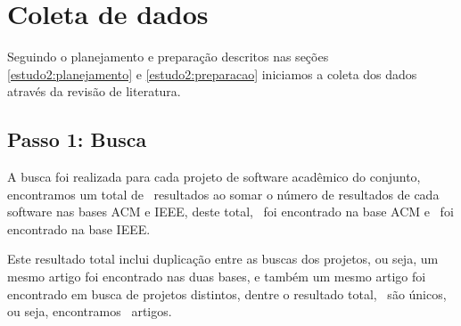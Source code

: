 

\section{Coleta de dados} \label{estudo2:coleta} %

Seguindo o planejamento e preparação descritos nas seções
\ref{estudo2:planejamento} e \ref{estudo2:preparacao} iniciamos a coleta dos
dados através da revisão de literatura.

\subsection{Passo 1: Busca}

A busca foi realizada para cada projeto de
software acadêmico do conjunto, encontramos um total de \SearchCount \
resultados ao somar o número de resultados de cada software nas bases ACM e
IEEE, deste total, \SearchACMCount \ foi encontrado na base ACM e
\SearchIEEECount \ foi encontrado na base IEEE.

Este resultado total inclui duplicação entre as buscas dos projetos, ou seja,
um mesmo artigo foi encontrado nas duas bases, e também um mesmo artigo foi
encontrado em busca de projetos distintos, dentre o resultado total,
\SearchUniqueCount \ são únicos, ou seja, encontramos \SearchUniqueCount \ artigos.




